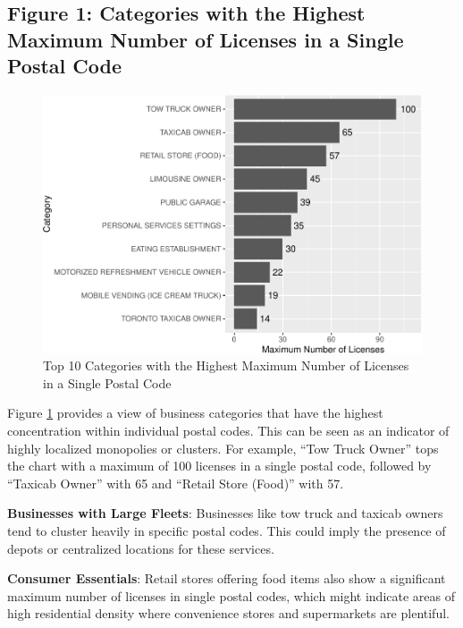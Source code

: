 \documentclass[
]{article}
\begin{document}
\hypertarget{figure-1-categories-with-the-highest-maximum-number-of-licenses-in-a-single-postal-code}{%
\subsection{Figure 1: Categories with the Highest Maximum Number of Licenses in a Single Postal Code}\label{figure-1-categories-with-the-highest-maximum-number-of-licenses-in-a-single-postal-code}}

\begin{figure}
\centering
\includegraphics{paper_files/figure-latex/max-1.pdf}
\caption{\label{fig:max}Top 10 Categories with the Highest Maximum Number of Licenses
in a Single Postal Code}
\end{figure}

Figure \ref{fig:max} provides a view of business categories that have the highest concentration within individual postal codes. This can be seen as an indicator of highly localized monopolies or clusters. For example, ``Tow Truck Owner'' tops the chart with a maximum of 100 licenses in a single postal code, followed by ``Taxicab Owner'' with 65 and ``Retail Store (Food)'' with 57.

\textbf{Businesses with Large Fleets}: Businesses like tow truck and taxicab owners tend to cluster heavily in specific postal codes. This could imply the presence of depots or centralized locations for these services.

\textbf{Consumer Essentials}: Retail stores offering food items also show a significant maximum number of licenses in single postal codes, which might indicate areas of high residential density where convenience stores and supermarkets are plentiful.
\end{document}
